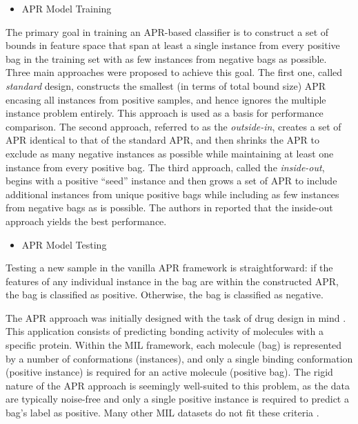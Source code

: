 \documentclass[12pt,dvips]{report}
\numberwithin{equation}{section}
\begin{document}
\begin{itemize}[leftmargin=12 pt]
\item APR Model Training
\end{itemize}

The primary goal in training an APR-based classifier is to construct a set of bounds in feature space that span at least a single instance from every positive bag in the training set with as few instances from negative bags as possible. Three main approaches were proposed to achieve this goal. The first one, called\emph{ standard }design, constructs the smallest (in terms of total bound size) APR encasing all instances from positive samples, and hence ignores the multiple instance problem entirely. This approach is used as a basis for performance comparison. The second approach, referred to as the \emph{outside-in}, creates a set of APR identical to that of the standard APR, and then shrinks the APR to exclude as many negative instances as possible while maintaining at least one instance from every positive bag. The third approach, called the \emph{inside-out}, begins with a positive ``seed'' instance and then grows a set of APR to include additional instances from unique positive bags while including as few instances from negative bags as is possible. The authors in \cite{diet97} reported that the inside-out approach yields the best performance. 

\begin{itemize}[leftmargin=12 pt]
\item APR Model Testing
\end{itemize}

Testing a new sample in the vanilla APR framework is straightforward: if the features of any individual instance in the bag are within the constructed APR, the bag is classified as positive. Otherwise, the bag is classified as negative.

The APR approach was initially designed with the task of drug design in mind \cite{diet97}. This application consists of predicting bonding activity of molecules with a specific protein. Within the MIL framework, each molecule (bag) is represented by a number of conformations (instances), and only a single binding conformation (positive instance) is required
for an active molecule (positive bag). The rigid nature of the APR approach is seemingly well-suited to this problem, as the data are typically noise-free and only a single positive instance is required to predict a bag's label as positive. Many other MIL datasets do not fit these criteria \cite{amor13}.
\end{document}

